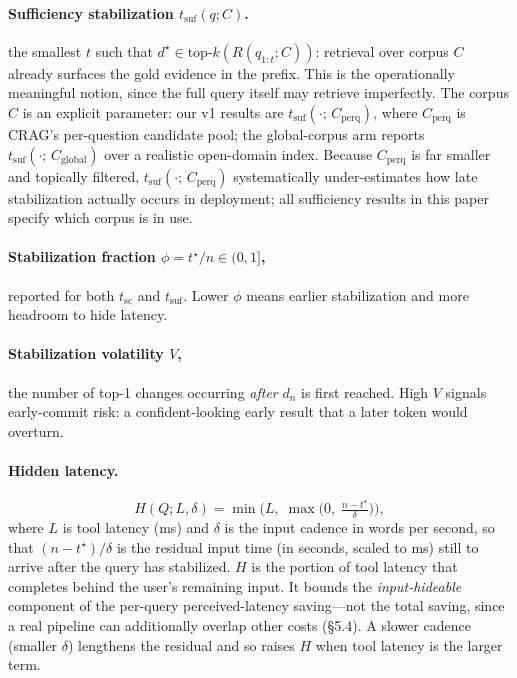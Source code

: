 \documentclass[11pt]{article}
\begin{document}
\paragraph{Sufficiency stabilization $t_{\mathrm{suf}}(q; C)$.} the smallest $t$
such that $d^\star \in \mathrm{top\text{-}}k(R(q_{1:t}; C))$: retrieval over
corpus $C$ already surfaces the gold evidence in the prefix. This is the
operationally meaningful notion, since the full query itself may retrieve
imperfectly. The corpus $C$ is an explicit parameter: our v1 results are
$t_{\mathrm{suf}}(\cdot;\,C_{\mathrm{perq}})$, where $C_{\mathrm{perq}}$ is
CRAG's per-question candidate pool; the global-corpus arm reports
$t_{\mathrm{suf}}(\cdot;\,C_{\mathrm{global}})$ over a realistic open-domain
index. Because $C_{\mathrm{perq}}$ is far smaller and topically filtered,
$t_{\mathrm{suf}}(\cdot;\,C_{\mathrm{perq}})$ systematically under-estimates
how late stabilization actually occurs in deployment; all sufficiency results
in this paper specify which corpus is in use.

\paragraph{Stabilization fraction $\phi = t^\star/n \in (0,1]$,} reported for both
$t_{\mathrm{sc}}$ and $t_{\mathrm{suf}}$. Lower $\phi$ means earlier stabilization
and more headroom to hide latency.

\paragraph{Stabilization volatility $V$,} the number of top-1 changes occurring
\emph{after} $d_n$ is first reached. High $V$ signals early-commit risk: a
confident-looking early result that a later token would overturn.

\paragraph{Hidden latency.}
\begin{equation}
H(Q; L, \delta) = \min\!\Big(L,\; \max\!\big(0,\; \tfrac{n - t^\star}{\delta}\big)\Big),
\end{equation}
where $L$ is tool latency (ms) and $\delta$ is the input cadence in words per
second, so that $(n-t^\star)/\delta$ is the residual input time (in seconds, scaled
to ms) still to arrive after the query has stabilized. $H$ is the portion of tool
latency that completes behind the user's remaining input. It bounds the
\emph{input-hideable} component of the per-query perceived-latency saving---not the
total saving, since a real pipeline can additionally overlap other costs (\S5.4).
A slower cadence (smaller $\delta$) lengthens the residual and so raises $H$ when
tool latency is the larger term.
\end{document}
